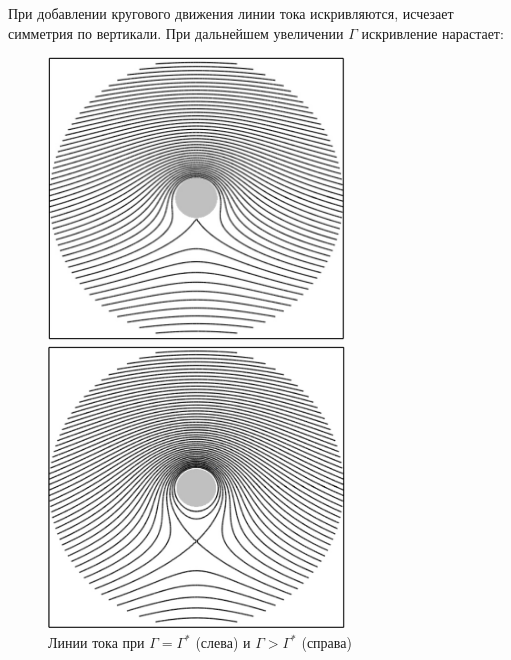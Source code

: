 При добавлении кругового движения линии тока искривляются, исчезает симметрия по вертикали. При дальнейшем увеличении $\Gamma$ искривление нарастает:
\begin{figure}[H]
    \centering
    \noindent
	\begin{minipage}{.5\textwidth}
	\centering
	  \includegraphics[width=0.7\textwidth]{photo/obtekaniecilindra3}
	\end{minipage}%
	\begin{minipage}{.5\textwidth}
	\centering
	  \includegraphics[width=0.7\textwidth]{photo/obtekaniecilindra4}
	\end{minipage}
    
    \caption{Линии тока при $\Gamma=\Gamma^*$ (слева) и $\Gamma>\Gamma^*$ (справа)}
    \label{fig:figure1}
\end{figure}

